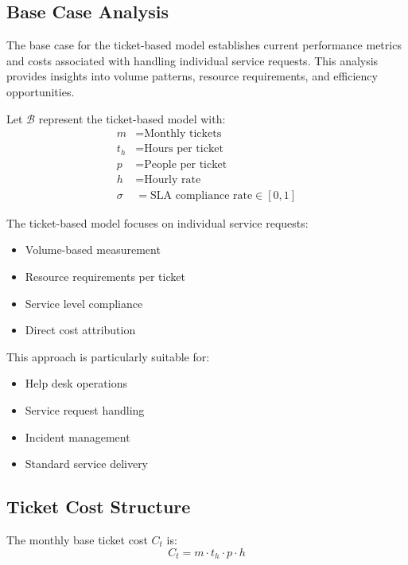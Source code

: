 \documentclass[12pt,a4paper]{article}
\newenvironment{definition}[1]
{\begin{mdframed}[style=definitionstyle,frametitle={Definition: #1}]}
{\end{mdframed}}
\newenvironment{explanation}
{\begin{mdframed}[style=explanationstyle,frametitle={Explanation}]}
{\end{mdframed}}
\begin{document}
\subsection{Base Case Analysis}
The base case for the ticket-based model establishes current performance metrics and costs associated with handling individual service requests. This analysis provides insights into volume patterns, resource requirements, and efficiency opportunities.

\begin{definition}{Ticket Model Variables}
Let $\mathcal{B}$ represent the ticket-based model with:
\begin{align*}
    m &= \text{Monthly tickets} \\
    t_h &= \text{Hours per ticket} \\
    p &= \text{People per ticket} \\
    h &= \text{Hourly rate} \\
    \sigma &= \text{SLA compliance rate} \in [0,1]
\end{align*}
\end{definition}

\begin{explanation}
The ticket-based model focuses on individual service requests:
\begin{itemize}
    \item Volume-based measurement
    \item Resource requirements per ticket
    \item Service level compliance
    \item Direct cost attribution
\end{itemize}

This approach is particularly suitable for:
\begin{itemize}
    \item Help desk operations
    \item Service request handling
    \item Incident management
    \item Standard service delivery
\end{itemize}
\end{explanation}

\subsection{Ticket Cost Structure}

\begin{definition}{Base Ticket Cost}
The monthly base ticket cost $C_t$ is:
\begin{equation}
    C_t = m \cdot t_h \cdot p \cdot h
\end{equation}
\end{definition}
\end{document}

